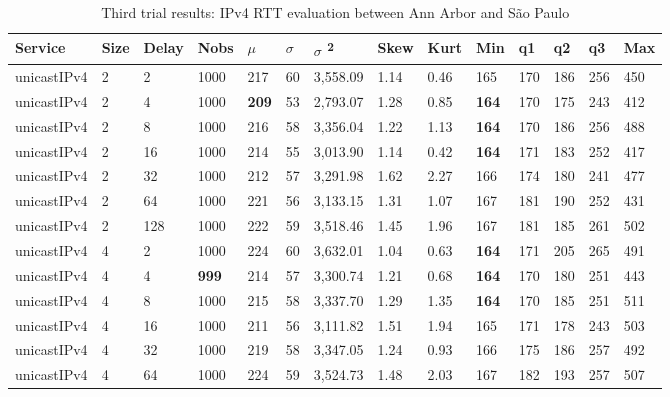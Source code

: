 \begin{table}[!htb]
	\small
	\centering
	\caption{Third trial results: IPv4 RTT evaluation between Ann Arbor and São Paulo}
	\label{tab:thirdtrialarbsaoipv4}
	\begin{tabular}{@{}llllllllllllll@{}}
		\toprule
		Service    & Size & Delay & Nobs & $\mu$ & $\sigma$  & $\sigma$ \textsuperscript{2} & Skew & Kurt & Min & q1   & q2   & q3   & Max   \\ \midrule
		unicastIPv4 & 2            & 2     & 1000 & 217  & 60  & 3,558.09 & 1.14     & 0.46     & 165 & 170 & 186 & 256 & 450  \\
		unicastIPv4 & 2            & 4     & 1000 & \textbf{209}  & 53  & 2,793.07 & 1.28     & 0.85     & \textbf{164} & 170 & 175 & 243 & 412  \\
		unicastIPv4 & 2            & 8     & 1000 & 216  & 58  & 3,356.04 & 1.22     & 1.13     & \textbf{164} & 170 & 186 & 256 & 488  \\
		unicastIPv4 & 2            & 16    & 1000 & 214  & 55  & 3,013.90 & 1.14     & 0.42     & \textbf{164} & 171 & 183 & 252 & 417  \\
		unicastIPv4 & 2            & 32    & 1000 & 212  & 57  & 3,291.98 & 1.62     & 2.27     & 166 & 174 & 180 & 241 & 477  \\
		unicastIPv4 & 2            & 64    & 1000 & 221  & 56  & 3,133.15 & 1.31     & 1.07     & 167 & 181 & 190 & 252 & 431  \\
		unicastIPv4 & 2            & 128   & 1000 & 222  & 59  & 3,518.46 & 1.45     & 1.96     & 167 & 181 & 185 & 261 & 502  \\ \hline
		unicastIPv4 & 4            & 2     & 1000 & 224  & 60  & 3,632.01 & 1.04     & 0.63     & \textbf{164} & 171 & 205 & 265 & 491  \\
		unicastIPv4 & 4            & 4     & \textbf{999}  & 214  & 57  & 3,300.74 & 1.21     & 0.68     & \textbf{164} & 170 & 180 & 251 & 443  \\
		unicastIPv4 & 4            & 8     & 1000 & 215  & 58  & 3,337.70 & 1.29     & 1.35     & \textbf{164} & 170 & 185 & 251 & 511  \\
		unicastIPv4 & 4            & 16    & 1000 & 211  & 56  & 3,111.82 & 1.51     & 1.94     & 165 & 171 & 178 & 243 & 503  \\
		unicastIPv4 & 4            & 32    & 1000 & 219  & 58  & 3,347.05 & 1.24     & 0.93     & 166 & 175 & 186 & 257 & 492  \\
		unicastIPv4 & 4            & 64    & 1000 & 224  & 59  & 3,524.73 & 1.48     & 2.03     & 167 & 182 & 193 & 257 & 507  \\

\end{tabular}
\end{table}
